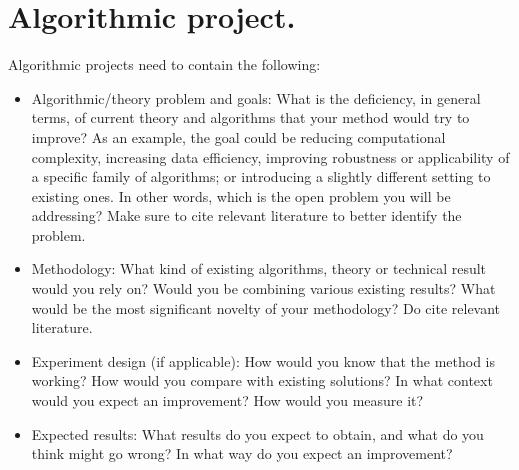 \documentclass[twoside,a4paper]{article}
\begin{document}
\section{Algorithmic project.}
Algorithmic projects need to contain the following:
\begin{itemize}
\item Algorithmic/theory problem and goals: What is the deficiency, in general terms, of current theory and algorithms that your method would try to improve? As an example, the goal could be reducing computational complexity, increasing data efficiency, improving robustness or applicability of a specific family of algorithms; or introducing a slightly different setting to existing ones. In other words, which is the open problem you will be addressing? Make sure to cite relevant literature to better identify the problem.
\item Methodology: What kind of existing algorithms, theory or technical result would you rely on? Would you be combining various existing results? What would be the most significant novelty of your methodology? Do cite relevant literature.
\item Experiment design (if applicable): How would you know that the method is working? How would you compare with existing solutions? In what context would you expect an improvement? How would you measure it? 
\item Expected results: What results do you expect to obtain, and what do you think might go wrong? In what way do you expect an improvement?
\end{itemize}
\end{document}
